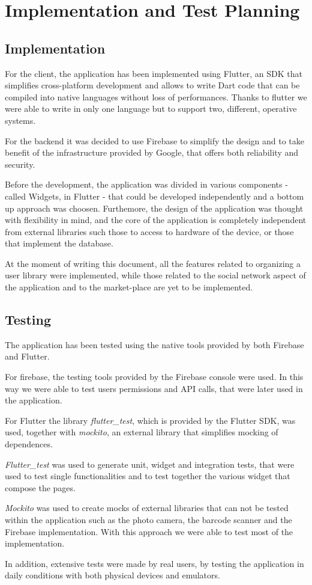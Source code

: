 \chapter{Implementation and Test Planning}

\section{Implementation}
For the client, the application has been implemented using Flutter, an SDK that simplifies cross-platform development and allows to write Dart code
that can be compiled into native languages without loss of performances. Thanks to flutter we were able to write in only one language but to support two,
different, operative systems.

For the backend it was decided to use Firebase to simplify the design and to take benefit of the infrastructure provided by Google,
that offers both reliability and security.

Before the development, the application was divided in various components - called Widgets, in Flutter - that could be developed independently and a bottom up approach was choosen.
Furthemore, the design of the application was thought with flexibility in mind, and the core of the application is completely independent from external
libraries such those to access to hardware of the device, or those that implement the database.

At the moment of writing this document, all the features related to organizing a user library were implemented, while those related to the social network 
aspect of the application and to the market-place are yet to be implemented.

\newpage
\section{Testing}
The application has been tested using the native tools provided by both Firebase and Flutter.

For firebase, the testing tools provided by the Firebase console were used. In this way we were able to test users permissions and API calls, that were later used in the application.

For Flutter the library \emph{flutter\_test}, which is provided by the Flutter SDK, was used, together with \emph{mockito}, an external library that simplifies mocking of dependences.

\emph{Flutter\_test} was used to generate unit, widget and integration tests, that were used to test single functionalities and to test together the various widget that compose the pages.

\emph{Mockito} was used to create mocks of external libraries that can not be tested within the application such as the photo camera, the barcode scanner and the Firebase implementation.
With this approach we were able to test most of the implementation.

In addition, extensive tests were made by real users, by testing the application in daily conditions with both physical devices and emulators.